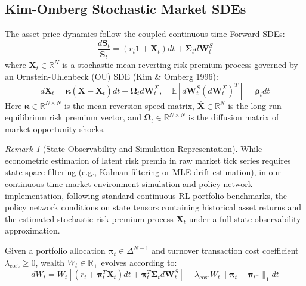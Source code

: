 \documentclass[11pt,a4paper]{article}
\theoremstyle{plain}
\theoremstyle{definition}
\theoremstyle{remark}
\newtheorem{remark}[theorem]{Remark}
\begin{document}
\subsection{Kim-Omberg Stochastic Market SDEs}
The asset price dynamics follow the coupled continuous-time Forward SDEs:
\begin{equation}
    \frac{d\mathbf{S}_t}{\mathbf{S}_t} = \left( r_t \mathbf{1} + \mathbf{X}_t \right) dt + \mathbf{\Sigma}_t d\mathbf{W}_t^S
\end{equation}
where $\mathbf{X}_t \in \mathbb{R}^N$ is a stochastic mean-reverting risk premium process governed by an Ornstein-Uhlenbeck (OU) SDE (Kim \& Omberg 1996):
\begin{equation}
    d\mathbf{X}_t = \mathbf{\kappa} (\bar{\mathbf{X}} - \mathbf{X}_t) dt + \mathbf{\Omega}_t d\mathbf{W}_t^X, \quad \mathbb{E}[d\mathbf{W}_t^S (d\mathbf{W}_t^X)^T] = \mathbf{\rho}_t dt
\end{equation}
Here $\mathbf{\kappa} \in \mathbb{R}^{N \times N}$ is the mean-reversion speed matrix, $\bar{\mathbf{X}} \in \mathbb{R}^N$ is the long-run equilibrium risk premium vector, and $\mathbf{\Omega}_t \in \mathbb{R}^{N \times N}$ is the diffusion matrix of market opportunity shocks.

\begin{remark}[State Observability and Simulation Representation]
While econometric estimation of latent risk premia in raw market tick series requires state-space filtering (e.g., Kalman filtering or MLE drift estimation), in our continuous-time market environment simulation and policy network implementation, following standard continuous RL portfolio benchmarks, the policy network conditions on state tensors containing historical asset returns and the estimated stochastic risk premium process $\mathbf{X}_t$ under a full-state observability approximation.
\end{remark}

Given a portfolio allocation $\mathbf{\pi}_t \in \Delta^{N-1}$ and turnover transaction cost coefficient $\lambda_{\text{cost}} \ge 0$, wealth $W_t \in \mathbb{R}_+$ evolves according to:
\begin{equation}
    dW_t = W_t \left[ \left( r_t + \mathbf{\pi}_t^T \mathbf{X}_t \right) dt + \mathbf{\pi}_t^T \mathbf{\Sigma}_t d\mathbf{W}_t^S \right] - \lambda_{\text{cost}} W_t \|\mathbf{\pi}_t - \mathbf{\pi}_{t^-}\|_1 dt
\end{equation}
\end{document}
